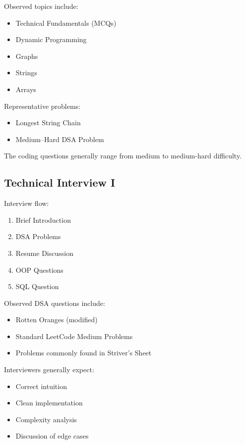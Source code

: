 \documentclass[11pt,a4paper]{article}
\begin{document}
Observed topics include:

\begin{itemize}
	\item Technical Fundamentals (MCQs)
	\item Dynamic Programming
	\item Graphs
	\item Strings
	\item Arrays
\end{itemize}

Representative problems:

\begin{itemize}
	\item Longest String Chain
	\item Medium--Hard DSA Problem
\end{itemize}

The coding questions generally range from medium to medium-hard difficulty.


\subsection{Technical Interview I}

Interview flow:

\begin{enumerate}
	\item Brief Introduction
	\item DSA Problems
	\item Resume Discussion
	\item OOP Questions
	\item SQL Question
\end{enumerate}

Observed DSA questions include:

\begin{itemize}
	\item Rotten Oranges (modified)
	\item Standard LeetCode Medium Problems
	\item Problems commonly found in Striver's Sheet
\end{itemize}

Interviewers generally expect:

\begin{itemize}
	\item Correct intuition
	\item Clean implementation
	\item Complexity analysis
	\item Discussion of edge cases
\end{itemize}
\end{document}
